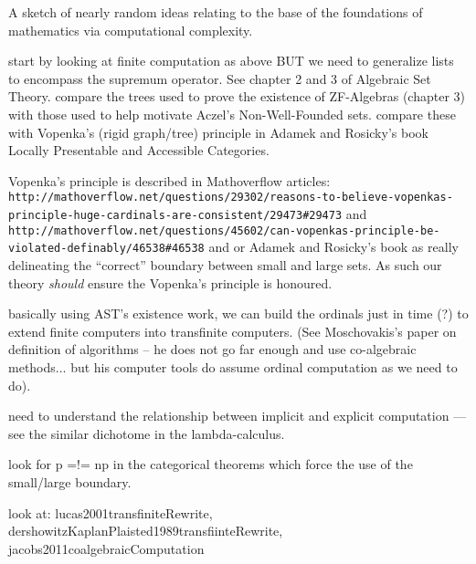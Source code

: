 \documentclass[a4paper,openany]{amsbook}
\begin{document}
A sketch of nearly random ideas relating to the base of the foundations of
mathematics via computational complexity.

start by looking at finite computation as above BUT we need to generalize lists
to encompass the supremum operator. See chapter 2 and 3 of Algebraic Set Theory.
compare the trees used to prove the existence of ZF-Algebras (chapter 3) with
those used to help motivate Aczel's Non-Well-Founded sets. compare these with
Vopenka's (rigid graph/tree) principle in Adamek and Rosicky's book Locally
Presentable and Accessible Categories.

Vopenka's principle is described in Mathoverflow articles:
\verb|http://mathoverflow.net/questions/29302/reasons-to-believe-vopenkas-principle-huge-cardinals-are-consistent/29473#29473|
and
\verb|http://mathoverflow.net/questions/45602/can-vopenkas-principle-be-violated-definably/46538#46538|
and or Adamek and Rosicky's book as really delineating the ``correct'' boundary
between small and large sets. As such our theory \emph{should} ensure the
Vopenka's principle is honoured.

basically using AST's existence work, we can build the ordinals just in time (?)
to extend finite computers into transfinite computers. (See Moschovakis's paper
on definition of algorithms -- he does not go far enough and use co-algebraic
methods... but his computer tools do assume ordinal computation as we need to
do).

need to understand the relationship between implicit and explicit computation
--- see the similar dichotome in the lambda-calculus.

look for p =!= np in the categorical theorems which force the use of the
small/large boundary.

look at: lucas2001transfiniteRewrite,
dershowitzKaplanPlaisted1989transfiinteRewrite,
jacobs2011coalgebraicComputation



\end{document}
